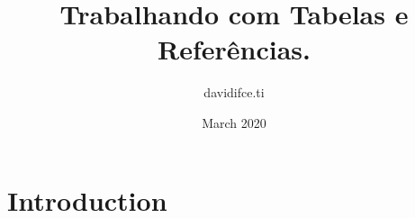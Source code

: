\documentclass{article}
\title{Trabalhando com Tabelas e Referências.}
\author{davidifce.ti }
\date{March 2020}
\begin{document}
\maketitle

\section{Introduction}
\end{document}
